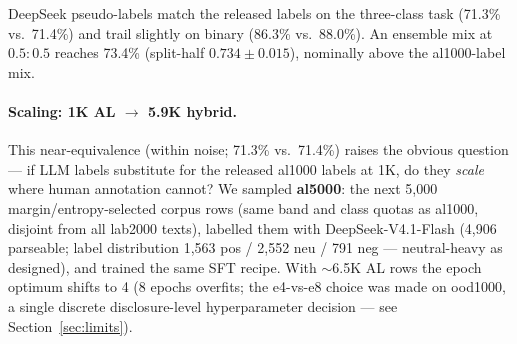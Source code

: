 \documentclass[11pt,a4paper]{article}
\begin{document}
DeepSeek pseudo-labels match the released labels on the three-class
task (71.3\% vs.\ 71.4\%) and trail slightly on binary (86.3\% vs.\
88.0\%). An ensemble mix at $0.5{:}0.5$ reaches 73.4\% (split-half
$0.734 \pm 0.015$), nominally above the al1000-label mix.

\paragraph{Scaling: 1K AL $\to$ 5.9K hybrid.} This near-equivalence
(within noise; 71.3\% vs.\ 71.4\%) raises the obvious question --- if LLM labels substitute for the
released al1000 labels at 1K, do they \emph{scale} where human
annotation cannot? We
sampled \textbf{al5000}: the next 5{,}000 margin/entropy-selected
corpus rows (same band and class quotas as al1000, disjoint from all
lab2000 texts), labelled them with DeepSeek-V4.1-Flash (4{,}906
parseable; label distribution 1{,}563 pos / 2{,}552 neu / 791 neg ---
neutral-heavy as designed), and trained the same SFT recipe. With
$\sim$6.5K AL rows the epoch optimum shifts to 4 (8 epochs overfits;
the e4-vs-e8 choice was made on ood1000, a single discrete
disclosure-level hyperparameter decision --- see
Section~\ref{sec:limits}).
\end{document}
